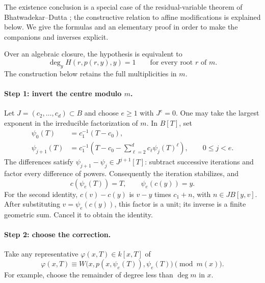 \documentclass[11pt,a4paper]{article}
\begin{document}
The existence conclusion is a special case of the residual-variable
theorem of Bhatwadekar--Dutta \cite[Theorem~3.2]{BD}; the constructive relation to
affine modifications is explained below. We give the formulas and an
elementary proof in order to make the companions and inverses explicit.

Over an algebraic closure, the hypothesis is equivalent to
\[
\deg_y H(r,p(r,y),y)=1\qquad\text{for every root }r\text{ of }m.
\]
The construction below retains the full multiplicities in $m$.

\paragraph{Step 1: invert the centre modulo $m$.}
Let $J=(c_2,\ldots,c_d)\subset B$ and choose $e\ge1$ with $J^e=0$.
One may take the largest exponent in the irreducible factorization of $m$.
In $B[T]$, set
\begin{equation}\label{eq:iteration}
\begin{aligned}
\psi_0(T)&=c_1^{-1}(T-c_0),\\
\psi_{j+1}(T)&=c_1^{-1}
\left(T-c_0-\sum_{\ell=2}^{d}c_\ell\psi_j(T)^\ell\right),
\qquad 0\le j<e.
\end{aligned}
\end{equation}
The differences satisfy $\psi_{j+1}-\psi_j\in J^{j+1}[T]$: subtract
successive iterations and factor every difference of powers. Consequently
the iteration stabilizes, and
\begin{equation}\label{eq:center-inverse}
c(\psi_e(T))=T,\qquad \psi_e(c(y))=y.
\end{equation}
For the second identity, $c(v)-c(y)$ is $v-y$ times $c_1+n$, with
$n\in J B[y,v]$. After substituting $v=\psi_e(c(y))$, this factor is a unit;
its inverse is a finite geometric sum. Cancel it to obtain the identity.

\paragraph{Step 2: choose the correction.}
Take any representative $\varphi(x,T)\in k[x,T]$ of
\begin{equation}\label{eq:correction}
\varphi(x,T)\equiv
W\bigl(x,p(x,\psi_e(T)),\psi_e(T)\bigr)\pmod{m(x)}.
\end{equation}
For example, choose the remainder of degree less than $\deg m$ in $x$.
\end{document}
